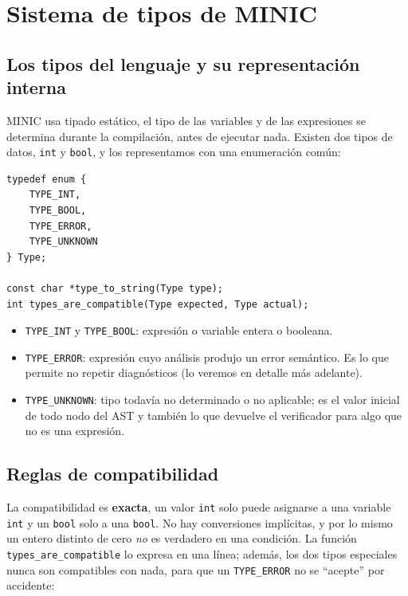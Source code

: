 \documentclass[12pt,letterpaper]{article}
\newcommand{\minic}{
  {M\footnotesize INI\normalsize C}
}
\begin{document}
\section*{Sistema de tipos de \minic{}}

\subsection*{Los tipos del lenguaje y su representación interna}

\minic{} usa tipado estático, el tipo de las variables y de las expresiones se determina durante la compilación,
antes de ejecutar nada. Existen dos tipos de datos, \texttt{int} y \texttt{bool}, y los representamos con una
enumeración común:

\begin{lstlisting}[style=modernc, caption={Representación de los tipos en \texttt{type.h}.}]
typedef enum {
    TYPE_INT,
    TYPE_BOOL,
    TYPE_ERROR,
    TYPE_UNKNOWN
} Type;

const char *type_to_string(Type type);
int types_are_compatible(Type expected, Type actual);
\end{lstlisting}

\bigskip

\begin{itemize}
\item \texttt{TYPE\_INT} y \texttt{TYPE\_BOOL}: expresión o variable entera o booleana.
\item \texttt{TYPE\_ERROR}: expresión cuyo análisis produjo un error semántico. Es lo que permite no repetir
  diagnósticos (lo veremos en detalle más adelante).
\item \texttt{TYPE\_UNKNOWN}: tipo todavía no determinado o no aplicable; es el valor inicial de todo nodo del
  AST y también lo que devuelve el verificador para algo que no es una expresión.
\end{itemize}

\subsection*{Reglas de compatibilidad}

La compatibilidad es \textbf{exacta}, un valor \texttt{int} solo puede asignarse a una variable \texttt{int} y
un \texttt{bool} solo a una \texttt{bool}. No hay conversiones implícitas, y por lo mismo un entero distinto de
cero \emph{no} es verdadero en una condición. La función \texttt{types\_are\_compatible} lo expresa en una línea;
además, los dos tipos especiales nunca son compatibles con nada, para que un \texttt{TYPE\_ERROR} no se
``acepte'' por accidente:
\end{document}
